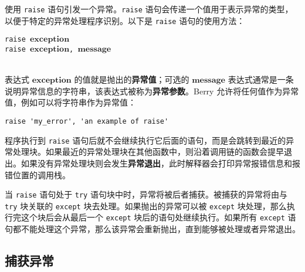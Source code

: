 使用 \texttt{raise} 语句引发一个异常。\texttt{raise} 语句会传递一个值用于表示异常的类型，以便于特定的异常处理程序识别。以下是 \texttt{raise} 语句的使用方法：
\begin{algorithm}
    \texttt{raise }$\bm{exception}$ \\
    \texttt{raise }$\bm{exception}$\texttt{, }$\bm{message}$
\end{algorithm}\vspace{-0.6em}\\
表达式 $\bm{exception}$ 的值就是抛出的\textbf{异常值}；可选的 $\bm{message}$ 表达式通常是一条说明异常信息的字符串，该表达式被称为\textbf{异常参数}。Berry 允许将任何值作为异常值，例如可以将字符串作为异常值：
\begin{lstlisting}[language=berry, numbers=none]
raise 'my_error', 'an example of raise'
\end{lstlisting}

程序执行到 \texttt{raise} 语句后就不会继续执行它后面的语句，而是会跳转到最近的异常处理块。如果最近的异常处理块在其他函数中，则沿着调用链的函数会提早退出。如果没有异常处理块则会发生\textbf{异常退出}，此时解释器会打印异常报错信息和报错位置的调用栈。

当 \texttt{raise} 语句处于 \texttt{try} 语句块中时，异常将被后者捕获。被捕获的异常将由与 \texttt{try} 块关联的 \texttt{except} 块去处理。如果抛出的异常可以被 \texttt{except} 块处理，那么执行完这个块后会从最后一个 \texttt{except} 块后的语句处继续执行。如果所有 \texttt{except} 语句都不能处理这个异常，那么该异常会重新抛出，直到能够被处理或者异常退出。

\subsection{捕获异常}

